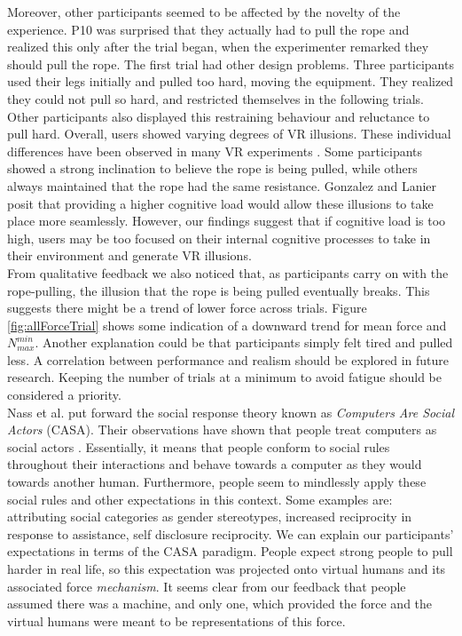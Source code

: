 Moreover, other participants  seemed to be affected by the novelty of the experience. P10 was surprised that they actually had to pull the rope and realized this only after the trial began, when the experimenter remarked they should pull the rope. The first trial had other design problems. Three participants used their legs initially and pulled too hard, moving the equipment. They realized they could not pull so hard, and restricted themselves in the following trials. Other participants also displayed this restraining behaviour and reluctance to pull hard. Overall, users showed varying degrees of VR illusions. These individual differences have been observed in many VR experiments \cite{gonzalez2017model}. Some participants showed a strong inclination to believe the rope is being pulled, while others always maintained that the rope had the same resistance. Gonzalez and Lanier posit that providing a higher cognitive load would allow these illusions to take place more seamlessly. However, our findings suggest that if cognitive load is too high, users may be too focused on their internal cognitive processes to take in their environment and generate VR illusions. 
\\
 From qualitative feedback we also noticed that, as participants carry on with the rope-pulling, the illusion that the rope is being pulled eventually breaks. This suggests there might be a trend of lower force across trials. Figure \ref{fig:allForceTrial} shows some indication of a downward trend for mean force and $N_{max}^{min}$. Another explanation could be that participants simply felt tired and pulled less. A correlation between performance and realism should be explored in future research. Keeping the number of trials at a minimum to avoid fatigue should be considered a priority. 
\\
Nass et al. put forward the social response theory known as \textit{Computers Are Social Actors} (CASA). Their observations have shown that people treat computers as social actors \cite{nass1994computers}. Essentially, it means that people conform to social rules throughout their interactions and behave towards a computer as they would towards another human. Furthermore, people seem to mindlessly apply these social rules and other expectations in this context. Some examples are: attributing social categories as gender stereotypes, increased reciprocity in response to assistance, self disclosure reciprocity. We can explain our participants' expectations in terms of the CASA paradigm. People expect strong people to pull harder in real life, so this expectation was projected onto virtual humans and its associated force \textit{mechanism}. It seems clear from our feedback that people assumed there was a machine, and only one, which provided the force and the virtual humans were meant to be representations of this force. 
